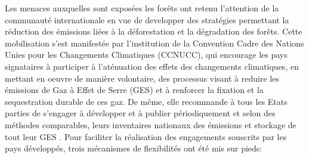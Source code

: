 \documentclass[
  12pt,
  a4paper,
  extrafontsizes,
  onecolumn,
  openright]{book}
\theoremstyle{definition}
\theoremstyle{definition}
\theoremstyle{definition}
\theoremstyle{definition}
\theoremstyle{remark}
\begin{document}
Les menaces auxquelles sont exposées les forêts ont retenu l'attention de la communauté internationale en vue de developper des stratégies permettant la réduction des émissions liées à la déforestation et la dégradation des forêts.
Cette mobilisation s'est manifestée par l'institution de la Convention Cadre des Nations Unies pour les Changements Climatiques (CCNUCC), qui encourage les pays signataires à participer à l'aténuation des effets des changements climatiques, en mettant en oeuvre de manière volontaire, des processus visant à reduire les émissions de Gaz à Effet de Serre (GES) et à renforcer la fixation et la sequestration durable de ces gaz.
De même, elle recommande à tous les Etats parties de s'engager à développer et à publier périodiquement et selon des méthodes comparables, leurs inventaires nationaux des émissions et stockage de tout leur GES \citep{Brown2002}.
Pour faciliter la réalisation des engagements souscrits par les pays développés, trois mécanismes de flexibilités ont été mis sur pieds:
\end{document}
